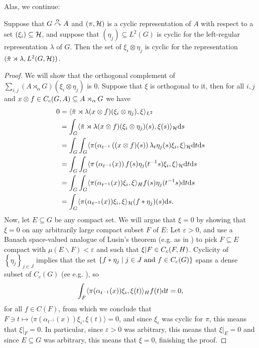 Alas, we continue:
\begin{lemma}
	Suppose that $G \stackrel{\alpha}{\curvearrowright} A$ and $(\pi,\mathcal{H})$ is a cyclic representation of $A$ with respect to a set $(\xi_i) \subseteq \mathcal{H}$, and suppose that $(\eta_j) \subseteq L^2(G)$ is cyclic for the left-regular representation $\lambda$ of $G$. Then the set of $\xi_i \otimes \eta_j$ is cyclic for the representation $(\tilde \pi \rtimes \lambda, L^2(G,\mathcal{H}))$.
	\label{mult:cyclic1}
\end{lemma}
\begin{proof}
	We will show that the orthogonal complement of $\sum_{i,j} (A \rtimes_\alpha G)(\xi_i \otimes \eta_j)$ is $0$. Suppose that $\xi$ is orthogonal to it, then for all $i,j$ and $x \otimes f \in C_c(G,A) \subseteq A \rtimes_\alpha G$ we have
	\begin{align*}
		0 &= \langle \tilde \pi \rtimes \lambda (x \otimes f) (\xi_i \otimes \eta_j) , \xi \rangle_{L^2}\\
		&= \int_G \langle \tilde \pi \rtimes \lambda (x \otimes f) (\xi_i \otimes \eta_j)(s) , \xi(s)\rangle_{\mathcal{H}} \mathrm{d} s \\
		&= \int_G \int_G \langle \pi(\alpha_{t^{-1}}\left( (x \otimes f)(s) \right) \lambda_t \eta_j(s) \xi_i , \xi \rangle_{\mathcal{H}} \mathrm{d} t \mathrm{d} s\\
		&= \int_G \int_G \langle \pi\left( \alpha_{t^{-1}} (x) \right) f(s) \eta_j(t^{-1}s) \xi_i , \xi \rangle_{\mathcal{H}} \mathrm{d} t\mathrm{d} s\\
		&= \int_G \int_G \langle \pi( \alpha_{t^{-1}}(x) ) \xi_i , \xi \rangle_H f(s) \eta_j(t^{-1}s) \mathrm{d} t \mathrm{d} s \\
		&= \int_G \langle \pi(\alpha_{t^{-1}}(x)) \xi_i , \xi \rangle_{\mathcal{H}} (f \ast \eta_j)(s) \mathrm{d} s.
	\end{align*}
	Now, let $E \subseteq G$ be any compact set. We will argue that $\xi = 0$ by showing that $\xi = 0$ on any arbitrarily large compact subset $F$ of $E$: Let $\varepsilon > 0$, and use a Banach space-valued analogue of Lusin's theorem (e.g. as in \cite[Appendix B]{williamscrossed}) to pick $F \subseteq E$ compact with $\mu(E\backslash F) < \varepsilon$ and such that $\xi|F \in C_c(F,H)$. Cyclicity of $\left\{ \eta_j \right\}_{j \in J}$ implies that the set $\{f \ast \eta_j \mid j \in J \text{ and } f \in C_c(G)\}$ spans a dense subset of $C_c(G)$ (ee e.g. \cite[Proposition 3.33]{folland2016fourier}), so
	\begin{align*}
		\int_{F} \langle \pi(\alpha_{t^{-1}}(x)) \xi_i , \xi(t) \rangle_H f(t) \mathrm{d} t = 0,
	\end{align*}
	for all $f \in C(F)$, from which we conclude that $F \ni t \mapsto \langle \pi(\alpha_{t^{-1}}(x)) \xi_i , \xi(t) \rangle=0$, and since $\xi_i$ was cyclic for $\pi$, this means that $\xi|_F = 0$. In particular, since $\varepsilon > 0$ was arbitrary, this means that $\xi|_E = 0$ and since $E \subseteq G$ was arbitrary, this means that $\xi = 0$, finishing the proof.
\end{proof}

